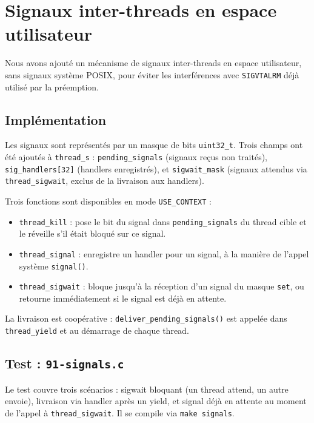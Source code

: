 \section{Signaux inter-threads en espace utilisateur}

Nous avons ajouté un mécanisme de signaux inter-threads en espace utilisateur,
sans signaux système POSIX, pour éviter les interférences avec \texttt{SIGVTALRM}
déjà utilisé par la préemption.

\subsection{Implémentation}

Les signaux sont représentés par un masque de bits \texttt{uint32\_t}. Trois
champs ont été ajoutés à \texttt{thread\_s} : \texttt{pending\_signals} (signaux
reçus non traités), \texttt{sig\_handlers[32]} (handlers enregistrés), et
\texttt{sigwait\_mask} (signaux attendus via \texttt{thread\_sigwait}, exclus
de la livraison aux handlers).

Trois fonctions sont disponibles en mode \texttt{USE\_CONTEXT} :

\begin{itemize}
    \item \texttt{thread\_kill} : pose le bit du signal dans
    \texttt{pending\_signals} du thread cible et le réveille s'il était bloqué
    sur ce signal.
    \item \texttt{thread\_signal} : enregistre un handler pour un signal,
    à la manière de l'appel système \texttt{signal()}.
    \item \texttt{thread\_sigwait} : bloque jusqu'à la réception d'un signal
    du masque \texttt{set}, ou retourne immédiatement si le signal est déjà en
    attente.
\end{itemize}

La livraison est coopérative : \texttt{deliver\_pending\_signals()} est appelée
dans \texttt{thread\_yield} et au démarrage de chaque thread.

\subsection{Test : \texttt{91-signals.c}}

Le test couvre trois scénarios : sigwait bloquant (un thread attend, un autre
envoie), livraison via handler après un yield, et signal déjà en attente au
moment de l'appel à \texttt{thread\_sigwait}. Il se compile via
\texttt{make signals}.
